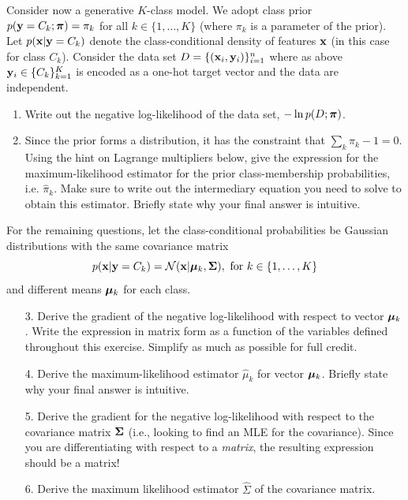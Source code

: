 \documentclass[submit]{harvardml}
\begin{document}
\begin{problem}

  Consider now a generative $K$-class model.  We adopt class prior
  $p(\mathbf{y} = C_k; \boldsymbol{\pi}) = \pi_k$ for all $k \in \{1, \ldots, K\}$
(where $\pi_k$ is a parameter of the prior).
Let  $p(\mathbf{x}|\mathbf{y}=C_k)$ denote
the class-conditional density of features $\mathbf{x}$ (in this
case for class $C_k$). Consider the data set $D = \{(\mathbf{x}_i,
\mathbf{y}_i)\}_{i=1}^n$ where as above $\mathbf{y}_i \in \{C_k\}_{k=1}^K$ is
encoded as a one-hot target vector and the data are independent.

\begin{enumerate}
  \item Write out the negative log-likelihood of the data set, $-\ln p(D ; \boldsymbol{\pi})$.

  \item Since the prior forms a distribution, it has the constraint that
    $\sum_k\pi_k - 1 = 0$.  Using the hint on
Lagrange multipliers below, give the
    expression for the maximum-likelihood estimator for the prior
    class-membership probabilities, i.e.
    $\hat \pi_k.$
    Make sure to write out the intermediary equation you need
    to solve to obtain this estimator. Briefly state why your final answer is intuitive.
\end{enumerate}

    For the remaining questions, let the
    class-conditional probabilities be Gaussian distributions with
the same covariance matrix
    $$p(\mathbf{x} | \mathbf{y} = C_k) = \mathcal{N}(\mathbf{x} |  \boldsymbol{\mu}_k, \mathbf{\Sigma}), \text{\ for\ }k \in \{1,\ldots, K\}$$ 
    and different means $\boldsymbol{\mu}_k$ for each class.

    \begin{enumerate}
  \item[3.] Derive the gradient of the negative log-likelihood with respect to vector $\boldsymbol{\mu}_k$.
    Write the expression in matrix form as a function of the variables defined
    throughout this exercise. Simplify as much as possible for full credit.
  \item[4.] Derive the maximum-likelihood estimator $\hat{\mu}_k$ for vector $\boldsymbol{\mu}_k$. Briefly state why your final answer is intuitive.
  \item[5.] Derive the gradient for the negative log-likelihood with respect to the
    covariance matrix $\mathbf{\Sigma}$ (i.e., looking
to find an MLE for the covariance).
Since you are differentiating with respect to a
    \emph{matrix}, the resulting expression should be a matrix!
%
  \item[6.] Derive the maximum likelihood estimator $\hat{\Sigma}$ of the covariance matrix.
\end{enumerate}


\end{problem}
\end{document}
